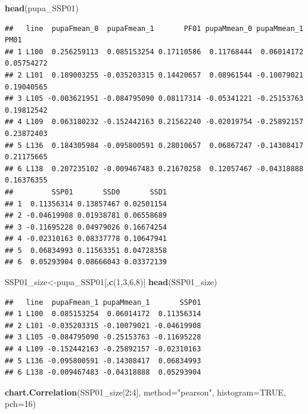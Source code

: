 \documentclass[
]{article}
\newenvironment{Shaded}{\begin{snugshade}}{\end{snugshade}}
\newcommand{\DataTypeTok}[1]{\textcolor[rgb]{0.13,0.29,0.53}{#1}}
\newcommand{\DecValTok}[1]{\textcolor[rgb]{0.00,0.00,0.81}{#1}}
\newcommand{\KeywordTok}[1]{\textcolor[rgb]{0.13,0.29,0.53}{\textbf{#1}}}
\newcommand{\NormalTok}[1]{#1}
\newcommand{\OperatorTok}[1]{\textcolor[rgb]{0.81,0.36,0.00}{\textbf{#1}}}
\newcommand{\OtherTok}[1]{\textcolor[rgb]{0.56,0.35,0.01}{#1}}
\newcommand{\StringTok}[1]{\textcolor[rgb]{0.31,0.60,0.02}{#1}}
\begin{document}
\begin{Shaded}
\begin{Highlighting}[]
\KeywordTok{head}\NormalTok{(pupa_SSP01)}
\end{Highlighting}
\end{Shaded}

\begin{verbatim}
##   line  pupaFmean_0  pupaFmean_1       PF01 pupaMmean_0 pupaMmean_1       PM01
## 1 L100  0.256259113  0.085153254 0.17110586  0.11768444  0.06014172 0.05754272
## 2 L101  0.109003255 -0.035203315 0.14420657  0.08961544 -0.10079021 0.19040565
## 3 L105 -0.003621951 -0.084795090 0.08117314 -0.05341221 -0.25153763 0.19812542
## 4 L109  0.063180232 -0.152442163 0.21562240 -0.02019754 -0.25892157 0.23872403
## 5 L136  0.184305984 -0.095800591 0.28010657  0.06867247 -0.14308417 0.21175665
## 6 L138  0.207235102 -0.009467483 0.21670258  0.12057467 -0.04318888 0.16376355
##         SSP01       SSD0       SSD1
## 1  0.11356314 0.13857467 0.02501154
## 2 -0.04619908 0.01938781 0.06558689
## 3 -0.11695228 0.04979026 0.16674254
## 4 -0.02310163 0.08337778 0.10647941
## 5  0.06834993 0.11563351 0.04728358
## 6  0.05293904 0.08666043 0.03372139
\end{verbatim}

\begin{Shaded}
\begin{Highlighting}[]
\NormalTok{SSP01_size<-pupa_SSP01[,}\KeywordTok{c}\NormalTok{(}\DecValTok{1}\NormalTok{,}\DecValTok{3}\NormalTok{,}\DecValTok{6}\NormalTok{,}\DecValTok{8}\NormalTok{)]}
\KeywordTok{head}\NormalTok{(SSP01_size)}
\end{Highlighting}
\end{Shaded}

\begin{verbatim}
##   line  pupaFmean_1 pupaMmean_1       SSP01
## 1 L100  0.085153254  0.06014172  0.11356314
## 2 L101 -0.035203315 -0.10079021 -0.04619908
## 3 L105 -0.084795090 -0.25153763 -0.11695228
## 4 L109 -0.152442163 -0.25892157 -0.02310163
## 5 L136 -0.095800591 -0.14308417  0.06834993
## 6 L138 -0.009467483 -0.04318888  0.05293904
\end{verbatim}

\begin{Shaded}
\begin{Highlighting}[]
\KeywordTok{chart.Correlation}\NormalTok{(SSP01_size[}\DecValTok{2}\OperatorTok{:}\DecValTok{4}\NormalTok{],}
                   \DataTypeTok{method=}\StringTok{"pearson"}\NormalTok{,}
                   \DataTypeTok{histogram=}\OtherTok{TRUE}\NormalTok{,}
                   \DataTypeTok{pch=}\DecValTok{16}\NormalTok{)}
\end{Highlighting}
\end{Shaded}
\end{document}
